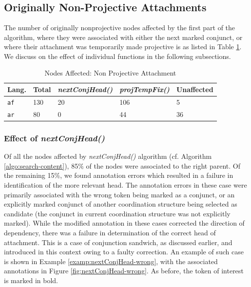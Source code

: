 \subsection{Originally Non-Projective Attachments}

The number of originally nonprojective nodes affected by the first part of the algorithm, where they were associated with either the next marked conjunct, or where their attachment was temporarily made projective is as listed in Table \ref{tab:affectedNodes1}. We discuss on the effect of individual functions in the following subsections.

\begin{table}[H]
\centering
    \begin{tabular}{|l|l|l|l|l|}
        \hline
        \textbf{Lang.} & \textbf{Total} & \textit{nextConjHead()} & \textit{projTempFix()} & Unaffected\\
        \hline
        \texttt{af} & 130 & 20 & 106 & 5\\
        \texttt{ar} & 80 & 0 & 44 & 36\\
        \hline
    \end{tabular}
    \caption{Nodes Affected: Non Projective Attachment}
    \label{tab:affectedNodes1}
\end{table}

\subsubsection{Effect of \textit{nextConjHead()}}

Of all the nodes affected by \textit{nextConjHead()} algorithm (cf. Algorithm \ref{algo:search-content}), 85\% of the nodes were associated to the right parent. Of the remaining 15\%, we found annotation errors which resulted in a failure in identification of the more relevant head. The annotation errors in these case were primarily associated with the wrong token being marked as a conjunct, or an explicitly marked conjunct of another coordination structure being selected as candidate (the conjunct in current coordination structure was not explicitly marked). While the modified annotation in these cases corrected the direction of dependency, there was a failure in determination of the correct head of attachment. This is a case of conjunction sandwich, as discussed earlier, and introduced in this context owing to a faulty correction. An example of such case is shown in Example \ref{examp:nextConjHead-wrong}, with the associated annotations in Figure \ref{fig:nextConjHead-wrong}. As before, the token of interest is marked in bold.

